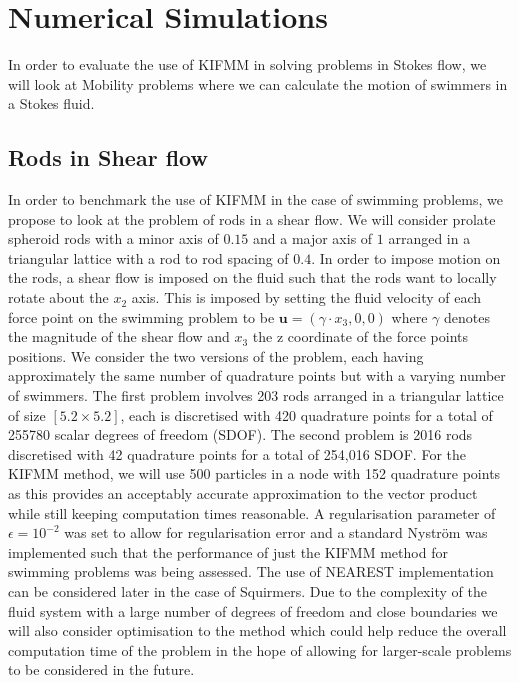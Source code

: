 \FloatBarrier
\section{Numerical Simulations} \label{sec:NumericalSims}
In order to evaluate the use of KIFMM in solving problems in Stokes flow, we will look at Mobility problems where we can calculate the motion of swimmers in a Stokes fluid.


\subsection{Rods in Shear flow}
In order to benchmark the use of KIFMM in the case of swimming problems, we propose to look at the problem of rods in a shear flow. We will consider prolate spheroid rods with a minor axis of $0.15$ and a major axis of $1$ arranged in a triangular lattice with a rod to rod spacing of $0.4$. In order to impose motion on the rods, a shear flow is imposed on the fluid such that the rods want to locally rotate about the $x_2$ axis. This is imposed by setting the fluid velocity of each force point on the swimming problem to be $\bm{u} = (\gamma\cdot x_3,0,0)$ where $\gamma$ denotes the magnitude of the shear flow and $x_3$ the z coordinate of the force points positions. We consider the two versions of the problem, each having approximately the same number of quadrature points but with a varying number of swimmers. The first problem involves 203 rods arranged in a triangular lattice of size $[5.2 \times 5.2]$, each is discretised with 420 quadrature points for a total of 255780 scalar degrees of freedom (SDOF). The second problem is 2016 rods discretised with 42 quadrature points for a total of 254,016 SDOF.  For the KIFMM method, we will use 500 particles in a node with 152 quadrature points as this provides an acceptably accurate approximation to the vector product while still keeping computation times reasonable. A regularisation parameter of $\epsilon=10^{-2}$ was set to allow for regularisation error and a standard Nyström was implemented such that the performance of just the KIFMM method for swimming problems was being assessed. The use of NEAREST implementation can be considered later in the case of Squirmers. Due to the complexity of the fluid system with a large number of degrees of freedom and close boundaries we will also consider optimisation to the method which could help reduce the overall computation time of the problem in the hope of allowing for larger-scale problems to be considered in the future. 


